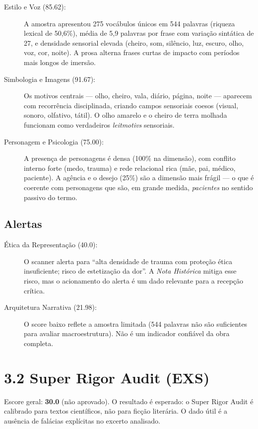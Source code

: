 \documentclass[14pt,openany]{extbook}
\begin{document}
\begin{description}
\item[Estilo e Voz (85.62):] A amostra apresentou 275 vocábulos únicos em 544 palavras (riqueza lexical de 50,6\%), média de 5,9 palavras por frase com variação sintática de 27, e densidade sensorial elevada (cheiro, som, silêncio, luz, escuro, olho, voz, cor, noite). A prosa alterna frases curtas de impacto com períodos mais longos de imersão.
\item[Simbologia e Imagens (91.67):] Os motivos centrais --- olho, cheiro, vala, diário, página, noite --- aparecem com recorrência disciplinada, criando campos sensoriais coesos (visual, sonoro, olfativo, tátil). O olho amarelo e o cheiro de terra molhada funcionam como verdadeiros \textit{leitmotivs} sensoriais.
\item[Personagem e Psicologia (75.00):] A presença de personagens é densa (100\% na dimensão), com conflito interno forte (medo, trauma) e rede relacional rica (mãe, pai, médico, paciente). A agência e o desejo (25\%) são a dimensão mais frágil --- o que é coerente com personagens que são, em grande medida, \textit{pacientes} no sentido passivo do termo.
\end{description}

\subsection*{Alertas}

\begin{description}
\item[Ética da Representação (40.0):] O scanner alerta para ``alta densidade de trauma com proteção ética insuficiente; risco de estetização da dor''. A \textit{Nota Histórica} mitiga esse risco, mas o acionamento do alerta é um dado relevante para a recepção crítica.
\item[Arquitetura Narrativa (21.98):] O score baixo reflete a amostra limitada (544 palavras não são suficientes para avaliar macroestrutura). Não é um indicador confiável da obra completa.
\end{description}

\section*{3.2 Super Rigor Audit (EXS)}

Escore geral: \textbf{30.0} (não aprovado). O resultado é esperado: o Super Rigor Audit é calibrado para textos científicos, não para ficção literária. O dado útil é a ausência de falácias explícitas no excerto analisado.
\end{document}
